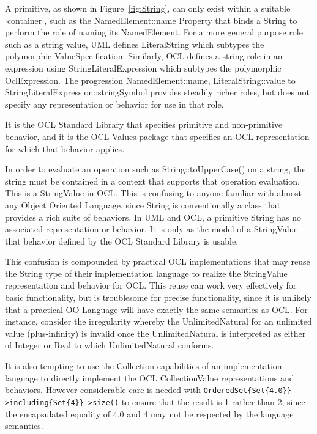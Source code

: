 \documentclass{eceasst}
\begin{document}
A primitive, as shown in Figure~\ref{fig:String}, can only exist within a suitable `container', such as the NamedElement::name Property that binds a String to perform the role of naming its NamedElement.  For a more general purpose role such as a string value, UML defines LiteralString which subtypes the polymorphic ValueSpecification. Similarly, OCL defines a string role in an expression using StringLiteralExpression which subtypes the polymorphic OclExpression. The progression NamedElement::name, LiteralString::value to StringLiteralExpression::stringSymbol provides steadily richer roles, but does not specify any representation or behavior for use in that role.

 It is the OCL Standard Library that specifies primitive and non-primitive behavior, and it is the OCL Values package that specifies an OCL representation for which that behavior applies. 

In order to evaluate an operation such as String::toUpperCase() on a string, the string must be contained in a context that supports that operation evaluation. This is a StringValue in OCL. This is confusing to anyone familiar with almost any Object Oriented Language, since String is conventionally a class that provides a rich suite of behaviors. In UML and OCL, a primitive String has no associated representation or behavior. It  is only as the model of a StringValue that behavior defined by the OCL Standard Library is usable.

This confusion is compounded by practical OCL implementations that may reuse the String type of their implementation language to realize the StringValue representation and behavior for OCL. This reuse can work very effectively for basic functionality, but is troublesome for precise functionality, since it is unlikely that a practical OO Language will have exactly the same semantics as OCL. For instance, consider the irregularity whereby the UnlimitedNatural for an unlimited value (plus-infinity)  is invalid once the UnlimitedNatural is interpreted as either of Integer or Real to which UnlimitedNatural conforms.

It is also tempting to use the Collection capabilities of an implementation language to directly implement the OCL CollectionValue representations and behaviors. However considerable care is needed with \verb|OrderedSet{Set{4.0}}->including{Set{4}}->size()| to ensure that the result is 1 rather than 2, since the encapsulated equality of 4.0 and 4 may not be respected by the language semantics.
\end{document}
